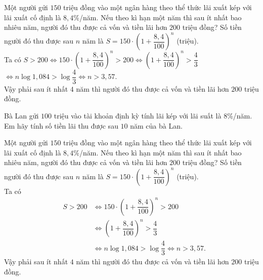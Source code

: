 \begin{bt}%
Một người gửi $150$ triệu đồng vào một ngân hàng theo thể thức lãi xuất kép với lãi xuất cố định là $8{,}4\%$/năm. Nếu theo kì hạn một năm thì sau ít nhất bao nhiêu năm, người đó thu được cả vốn và tiền lãi hơn $200$ triệu đồng?
\loigiai
{
Số tiền người đó thu được sau $n$ năm là $S=150\cdot{\left(1+\dfrac{8{,}4}{100}\right)^n}$ (triệu).\\
Ta có $S>200\Leftrightarrow 150 \cdot{\left(1+\dfrac{8{,}4}{100}\right)^n}>200 \Leftrightarrow{\left(1+\dfrac{8{,}4}{100}\right)^n}>\dfrac{4}{3}$ \\
$\Leftrightarrow n\log 1{,}084>\log \dfrac{4}{3}\Leftrightarrow n>3{,}57$.\\
Vậy phải sau ít nhất $4$ năm thì người đó thu được cả vốn và tiền lãi hơn $200$ triệu đồng.
}
\end{bt}

\begin{bt}%
	Bà Lan gửi $100$ triệu vào tài khoản định kỳ tính lãi kép với lãi suất là $8$\%/năm. Em hãy tính số tiền lãi thu được sau $10$ năm của bà Lan.
\end{bt}

\begin{bt}%

	Một người gửi $150$ triệu đồng vào một ngân hàng theo thể thức lãi xuất kép với lãi xuất cố định là $8{,}4\%$/năm. Nếu theo kì hạn một năm thì sau ít nhất bao nhiêu năm, người đó thu được cả vốn và tiền lãi hơn $200$ triệu đồng?
	\loigiai
	{
	Số tiền người đó thu được sau $n$ năm là $S=150\cdot{\left(1+\dfrac{8{,}4}{100}\right)^n}$ (triệu).\\
	Ta có
		\begin{eqnarray*}
			&  S>200 &\Leftrightarrow 150 \cdot{\left(1+\dfrac{8{,}4}{100}\right)^n}>200\\
			& &\Leftrightarrow {\left(1+\dfrac{8{,}4}{100}\right)^n}>\dfrac{4}{3}\\
			& &\Leftrightarrow n\log 1{,}084>\log \dfrac{4}{3}\Leftrightarrow n>3{,}57.
		\end{eqnarray*}
	Vậy phải sau ít nhất $4$ năm thì người đó thu được cả vốn và tiền lãi hơn $200$ triệu đồng.
}
\end{bt}

